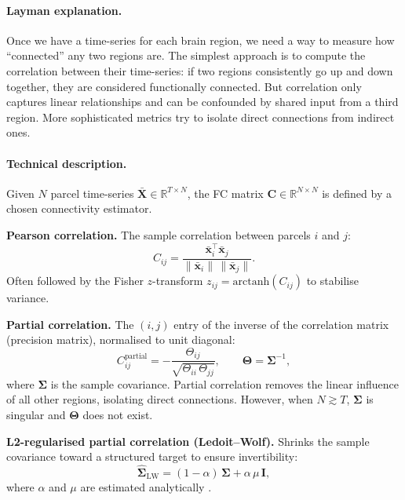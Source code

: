 \documentclass[11pt,a4paper]{article}
\begin{document}
\paragraph{Layman explanation.}
Once we have a time-series for each brain region, we need a way to measure how ``connected'' any two regions are.  The simplest approach is to compute the correlation between their time-series: if two regions consistently go up and down together, they are considered functionally connected.  But correlation only captures linear relationships and can be confounded by shared input from a third region.  More sophisticated metrics try to isolate direct connections from indirect ones.

\paragraph{Technical description.}
Given $N$ parcel time-series $\bar{\mathbf{X}} \in \mathbb{R}^{T \times N}$, the FC matrix $\mathbf{C} \in \mathbb{R}^{N \times N}$ is defined by a chosen connectivity estimator.

\textbf{Pearson correlation.}  The sample correlation between parcels $i$ and $j$:
\begin{equation}
    C_{ij} = \frac{\bar{\mathbf{x}}_i^\top \bar{\mathbf{x}}_j}{\|\bar{\mathbf{x}}_i\| \, \|\bar{\mathbf{x}}_j\|}.
\end{equation}
Often followed by the Fisher $z$-transform $z_{ij} = \mathrm{arctanh}(C_{ij})$ to stabilise variance.

\textbf{Partial correlation.}  The $(i,j)$ entry of the inverse of the correlation matrix (precision matrix), normalised to unit diagonal:
\begin{equation}
    C_{ij}^{\mathrm{partial}} = -\frac{\Theta_{ij}}{\sqrt{\Theta_{ii}\,\Theta_{jj}}}, \qquad \boldsymbol\Theta = \boldsymbol\Sigma^{-1},
\end{equation}
where $\boldsymbol\Sigma$ is the sample covariance.  Partial correlation removes the linear influence of all other regions, isolating direct connections.  However, when $N \gtrsim T$, $\boldsymbol\Sigma$ is singular and $\boldsymbol\Theta$ does not exist.

\textbf{L2-regularised partial correlation (Ledoit--Wolf).}  Shrinks the sample covariance toward a structured target to ensure invertibility:
\begin{equation}
    \hat{\boldsymbol\Sigma}_{\mathrm{LW}} = (1 - \alpha)\,\boldsymbol\Sigma + \alpha\,\mu\,\mathbf{I},
\end{equation}
where $\alpha$ and $\mu$ are estimated analytically \citep{ledoit2004}.
\end{document}
